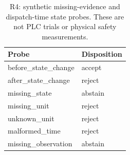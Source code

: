 \begin{table}[t]
\centering\footnotesize
\caption{R4: synthetic missing-evidence and dispatch-time state probes. These are not PLC trials or physical safety measurements.}
\label{tab:revision-degradation}
\begin{tabular}{@{}ll@{}}
\toprule
Probe & Disposition \\
\midrule
before\_state\_change & accept \\
after\_state\_change & reject \\
missing\_state & abstain \\
missing\_unit & reject \\
unknown\_unit & reject \\
malformed\_time & reject \\
missing\_observation & abstain \\
\bottomrule
\end{tabular}
\end{table}
